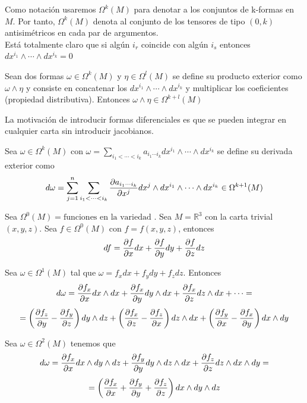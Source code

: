 \documentclass[palatino, bibnumbers]{apuntes}
\begin{document}
\begin{obs}Como notación usaremos $\Omega^k(M)$ para denotar a los conjuntos de k-formas en $M$. Por tanto, $\Omega^k(M)$ denota al conjunto de los tensores de tipo $(0,k)$ antisimétricos en cada par de argumentos.\\ Está totalmente claro que si algún $i_r$ coincide con algún $i_s$ entonces $dx^{i_1}\wedge\cdots\wedge dx^{i_k}=0$
\end{obs}

\begin{defn}Sean dos formas $\omega\in\Omega^k(M)$ y $\eta\in\Omega^l(M)$ se define su producto exterior como $\omega\wedge\eta$ y consiste en concatenar los $dx^{i_1}\wedge\cdots\wedge dx^{i_k}$ y multiplicar los coeficientes (propiedad distributiva). Entonces $\omega\wedge\eta\in\Omega^{k+l}(M)$
\end{defn}

La motivación de introducir formas diferenciales es que se pueden integrar en cualquier carta sin introducir jacobianos.

\begin{defn} Sea $\omega\in\Omega^k(M)$ con $\omega=\sum_{i_1<\cdots<i_k}a_{i_1\cdots i_k}dx^{i_1}\wedge\cdots\wedge dx^{i_k}$ se define su derivada exterior como $$d\omega=\sum_{j=1}^{n}\sum_{i_1<\cdots<i_k}\pdv{a_{i_1\cdots i_k}}{x^j}dx^j\wedge dx^{i_1}\wedge\cdots\wedge dx^{i_k}\in\Omega^{k+1}(M)$$
\end{defn}

\begin{example} Sea $\Omega^0(M)=\text{funciones en la variedad }$. Sea $M=\mathbb{R}^3$ con la carta trivial $(x,y,z)$. Sea $f\in\Omega^0(M)$ con $f=f(x,y,z)$, entonces $$df=\pdv{f}{x}dx+\pdv{f}{y}dy+\pdv{f}{z}dz$$
\end{example}

\begin{example} Sea $\omega\in\Omega^1(M)$ tal que $\omega=f_xdx+f_ydy+f_zdz$. Entonces $$d\omega=\pdv{f_x}{x}dx\wedge dx+ \pdv{f_x}{y}dy\wedge dx+\pdv{f_x}{z}dz\wedge dx+\cdots=$$ $$=\left(\pdv{f_z}{y}-\pdv{f_y}{z}\right)dy\wedge dz+\left(\pdv{f_x}{z}-\pdv{f_z}{x}\right)dz\wedge dx+ \left(\pdv{f_y}{x}-\pdv{f_x}{y}\right)dx\wedge dy$$
\end{example}

\begin{example} Sea $\omega\in\Omega^2(M)$ tenemos que $$d\omega=\pdv{f_x}{x}dx\wedge dy\wedge dz+\pdv{f_y}{y}dy\wedge dz\wedge dx+\pdv{f_z}{z}dz\wedge dx\wedge dy=$$
$$=\left(\pdv{f_x}{x}+\pdv{f_y}{y}+\pdv{f_z}{z}\right)dx\wedge dy\wedge dz$$
\end{example}
\end{document}
